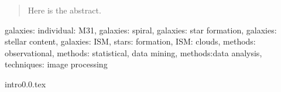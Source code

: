 \documentclass[useAMS,usenatbib]{mn2e}
\newcommand \um    {$\mu$m\ }
\newcommand \mice {$\mu$m}
\begin{document}
\begin{abstract} 
Here is the abstract.

\end{abstract}
\begin{keywords} 
galaxies: individual: M31, galaxies: spiral, galaxies: star formation, galaxies: stellar content, galaxies: ISM, stars: formation, ISM: clouds, methods: observational, methods: statistical, data mining, methods:data analysis, techniques: image processing 
\end{keywords}
{intro0.0.tex}
\end{document}
